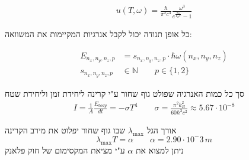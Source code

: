 \begin{cheatformula}
    \begin{align*}
    u(T,\omega) = \frac{\hbar}{\pi^2 c^3} \frac{\omega ^3}{e^{\frac{\hbar \omega}{k_B T}}-1}
\end{align*} 

כל אופן תנודה יכול לקבל אנרגיות המקיימות את המשוואה:

\begin{align*}
E_{n_x,n_y,n_z,p} &= s_{n_x,n_y,n_z,p} \cdot \hbar \omega(n_x,n_y,n_z) \\
s_{n_x,n_y,n_z,p} &\in \mathbb{N} \qquad p \in \{1,2\}
\end{align*}

\end{cheatformula}
\begin{cheatformula}
סך כל כמות האנרגיה שפולט גוף שחור ע"י קרינה ליחידת זמן וליחידת שטח
\begin{align*}
    I = \frac{1}{A} \frac{E_{body}}{dt} = -\sigma T^4 \qquad \sigma = \frac{\pi ^2 k_B ^2}{60\hbar ^3 c^2} \approx 5.67 \cdot 10^{-8}
\end{align*}
\end{cheatformula}

\begin{cheatformula}
    אורך הגל $\lambda_{\max}$ שבו גוף שחור יפלוט את מירב הקרינה
    $$\lambda_{\max} T = \alpha \qquad \alpha = 2.90 \cdot 10^-3 \, m$$
    ניתן למצוא את $\alpha$ ע"י מציאת המקסימום של חוק פלאנק 
\end{cheatformula}
